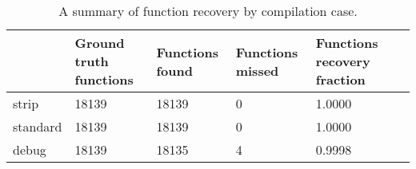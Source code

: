 \begin{table}[htb]
\centering
\caption{A summary of function recovery by compilation case.}
\label{table:opts-functions-summary}
\begin{tabular}{lp{}p{}p{}p{}p{}}
\toprule
{} &  Ground truth functions &  Functions found &  Functions missed &  Functions recovery fraction \\
\midrule
strip    &                   18139 &            18139 &                 0 &                       1.0000 \\
standard &                   18139 &            18139 &                 0 &                       1.0000 \\
debug    &                   18139 &            18135 &                 4 &                       0.9998 \\
\bottomrule
\end{tabular}
\end{table}
